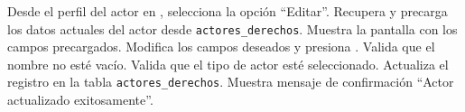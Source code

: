 \begin{UCtrayectoria}
	\UCpaso[\UCactor] Desde el perfil del actor en , selecciona la opción ``Editar''.
	\UCpaso Recupera y precarga los datos actuales del actor desde \texttt{actores\_derechos}.
	\UCpaso Muestra la pantalla  con los campos precargados.
	\UCpaso[\UCactor] \label{CU-49.modificaDatos} Modifica los campos deseados y presiona .
	\UCpaso Valida que el nombre no esté vacío. 
	\UCpaso Valida que el tipo de actor esté seleccionado. 
	\UCpaso Actualiza el registro en la tabla \texttt{actores\_derechos}.
	\UCpaso Muestra mensaje de confirmación ``Actor actualizado exitosamente''.
\end{UCtrayectoria}

